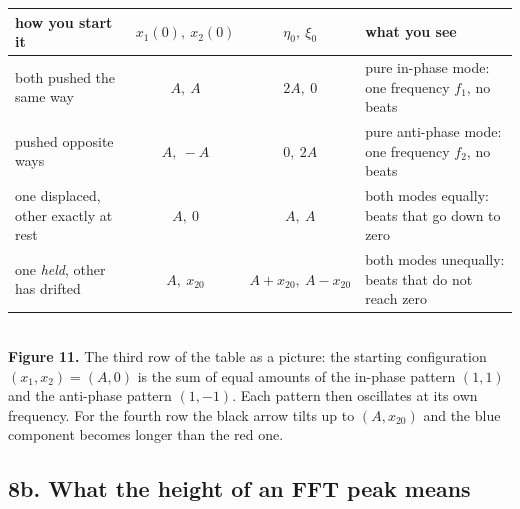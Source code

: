 \documentclass[11pt,a4paper]{article}
\begin{document}
\begin{center}\footnotesize
\begin{tabular}{@{}p{3.6cm}ccp{5.6cm}@{}}
\toprule
how you start it & $x_1(0),\ x_2(0)$ & $\eta_0,\ \xi_0$ & what you see\\
\midrule
both pushed the same way & $A,\ A$ & $2A,\ 0$ & pure in-phase mode: one frequency $f_1$, no beats\\
pushed opposite ways & $A,\ -A$ & $0,\ 2A$ & pure anti-phase mode: one frequency $f_2$, no beats\\
one displaced, other exactly at rest & $A,\ 0$ & $A,\ A$ & both modes equally: beats that go down to zero\\
one \emph{held}, other has drifted & $A,\ x_{20}$ & $A+x_{20},\ A-x_{20}$ & both modes unequally: beats that do not reach zero\\
\bottomrule
\end{tabular}
\end{center}

\begin{center}
\\[2pt]
{\small\textbf{Figure 11.} The third row of the table as a picture: the starting configuration $(x_1,x_2)=(A,0)$ is the sum of equal amounts of the in-phase pattern $(1,1)$ and the anti-phase pattern $(1,-1)$. Each pattern then oscillates at its own frequency. For the fourth row the black arrow tilts up to $(A,x_{20})$ and the blue component becomes longer than the red one.}
\end{center}

\subsection*{8b. What the height of an FFT peak means}
\end{document}
